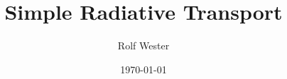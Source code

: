 \documentclass[fleqn]{scrartcl}
\title{Simple Radiative Transport}
\author{Rolf Wester}
\date{\today}
\begin{document}
\maketitle
\tableofcontents

\graphicspath{{chapter/CompOpt/figures/}
              {chapter/ApproximationInterpolation/figures/}
              {chapter/LightFieldTensor_of_Curvature/figures/}
              {chapter/Monge-Ampere/figures/} }




%
%
%
%
%
%
%
%
%
%
%
%
%
%
%
%
%
%
%
%
%
%
%
%
%
%
%
%
%
%
%
\end{document}
